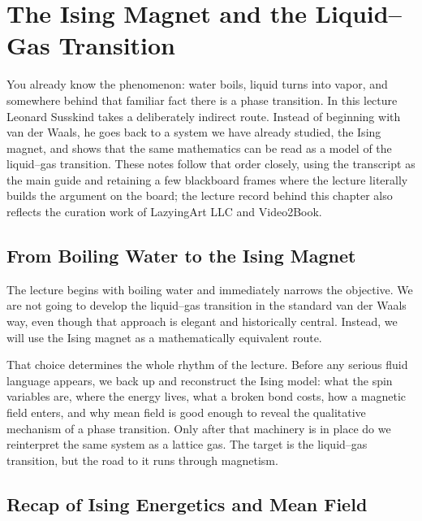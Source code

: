 \chapter{The Ising Magnet and the Liquid--Gas Transition}

You already know the phenomenon: water boils, liquid turns into vapor, and somewhere behind that familiar fact there is a phase transition. In this lecture Leonard Susskind takes a deliberately indirect route. Instead of beginning with van der Waals, he goes back to a system we have already studied, the Ising magnet, and shows that the same mathematics can be read as a model of the liquid--gas transition. These notes follow that order closely, using the transcript as the main guide and retaining a few blackboard frames where the lecture literally builds the argument on the board; the lecture record behind this chapter also reflects the curation work of LazyingArt LLC and Video2Book.

\section{From Boiling Water to the Ising Magnet}

The lecture begins with boiling water and immediately narrows the objective. We are not going to develop the liquid--gas transition in the standard van der Waals way, even though that approach is elegant and historically central. Instead, we will use the Ising magnet as a mathematically equivalent route.

That choice determines the whole rhythm of the lecture. Before any serious fluid language appears, we back up and reconstruct the Ising model: what the spin variables are, where the energy lives, what a broken bond costs, how a magnetic field enters, and why mean field is good enough to reveal the qualitative mechanism of a phase transition. Only after that machinery is in place do we reinterpret the same system as a lattice gas. The target is the liquid--gas transition, but the road to it runs through magnetism.

\section{Recap of Ising Energetics and Mean Field}

